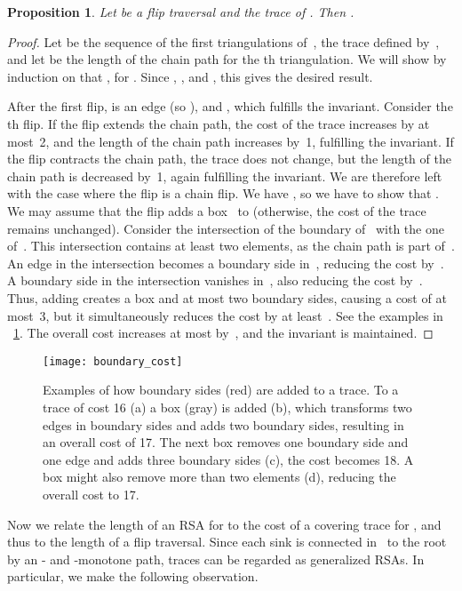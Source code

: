 \documentclass[a4paper,11pt]{article}
\newtheorem{proposition}[theorem]{Proposition}
\newcommand{\qedopt}{}
\begin{document}
\begin{proposition}\label{prp_cost}
Let  be a flip traversal and
 the trace of  . Then .
\end{proposition}
\begin{proof}
Let  be the sequence of the first  triangulations of~,  the trace defined by~, and let  be the length of the chain path for the th triangulation.
We will show by induction on  that , for .
Since , , and , this gives the desired result.

After the first flip,  is an edge (so ), and , which fulfills the invariant.
Consider the th flip.
If the flip extends the chain path, the cost of the trace increases by at most~2, and the length of the chain path increases by~1, fulfilling the invariant.
If the flip contracts the chain path, the trace does not change, but the length of the chain path is decreased by~1, again fulfilling the invariant.
We are therefore left with the case where the flip is a chain flip.
We have , so we have to show that .
We may assume that the flip adds a box~ to  (otherwise,
the cost of the trace remains unchanged).
Consider the intersection of the boundary of~ with the one of~.
This intersection contains at least two elements, as the chain path is part of~.
An edge in the intersection becomes a boundary side in~, reducing the cost by~.
A boundary side in the intersection vanishes in~, also reducing the cost by~.
Thus, adding  creates a box and at most two boundary sides, causing a cost 
of at most~3, but it simultaneously reduces the cost by at least~.
See the examples in \figurename~\ref{fig_boundary_cost}.
The overall cost increases at most by~, and the invariant is maintained.
\qedopt
\end{proof}

\begin{figure}[ht]
\centering
\texttt{[image: boundary\_cost]}
\caption{Examples of how boundary sides (red) are added to a trace.
To a trace of cost 16 (a) a box (gray) is added (b), which transforms 
two edges in boundary sides and adds two boundary sides, resulting in 
an overall cost of 17.
The next box removes one boundary side and one edge and adds three 
boundary sides (c), the cost becomes 18.
A box might also remove more than two elements (d), reducing the overall 
cost to 17.
}
\label{fig_boundary_cost}
\end{figure}

Now we relate the length of an RSA for  to the cost of a covering trace for , and thus to the length of a flip traversal.
Since each sink is connected in~ to the root by an - and -monotone path, traces can be regarded as generalized RSAs.
In particular, we make the following observation.
\end{document}
